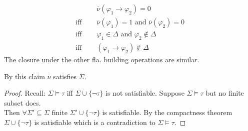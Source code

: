 {\begin{enumerate}
\begin{claimproof}
\begin{itemize}
\begin{enumerate}
\begin{equation*}
\begin{split}
                            &\overline{\nu}(\varphi_1\to \varphi_2) = 0\\
                            \text{iff }\quad&\overline{\nu}(\varphi_1) = 1 \text{ and } \overline{\nu}(\varphi_2) = 0\\
                            \text{iff }\quad& \varphi_1 \in \Delta \text{ and }\varphi_2 \notin \Delta\\
                            \text{iff }\quad& (\varphi_1\to \varphi_2)\notin \Delta 
                        \end{split}
                    \end{equation*}
                    The closure under the other fla. building operations are similar.\qedhere
                \end{enumerate}
            \end{itemize}
        \end{claimproof}
        By this claim $\overline{\nu}$ satisfies $\Sigma$.\qedhere
    \end{enumerate}
}
\begin{proof}
    Recall: $\Sigma\models \tau$ iff $\Sigma\cup\{\lnot \tau\}$ is not satisfiable.
    Suppose $\Sigma\models \tau$ but no finite subset does. \\
    Then $\forall \Sigma'\subseteq \Sigma \text{ finite } \Sigma'\cup \{\lnot \tau\}$ is satisfiable.
    By the compactness theorem $\Sigma\cup \{\lnot \tau\}$ is satisfiable which is a contradiction to $\Sigma\models \tau$.
\end{proof}

